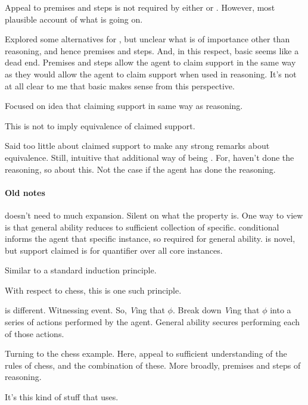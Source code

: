 \begin{note}[Alternatives]
  Appeal to premises and steps is not required by either \AR{} or \WR{}.
  However, most plausible account of what is going on.

  Explored some alternatives for \AR{}, but unclear what is of importance other than reasoning, and hence premises and steps.
  And, in this respect, basic \AR{} seems like a dead end.
  Premises and steps allow the agent to claim support in the same way as they would allow the agent to claim support when used in reasoning.
  It's not at all clear to me that basic \AR{} makes sense from this perspective.
\end{note}

\begin{note}
  Focused on idea that claiming support in same way as reasoning.

  This is not to imply equivalence of claimed support.

  Said too little about claimed support to make any strong remarks about equivalence.
  Still, intuitive that additional way of being \mom{}.
  For, haven't done the reasoning, so \mom{} about this.
  Not the case if the agent has done the reasoning.
\end{note}

\paragraph{Old notes}

\begin{note}
  \AR{} doesn't need to much expansion.
  Silent on what the property is.
  One way to view is that general ability reduces to sufficient collection of specific.
  \gsi{} conditional informs the agent that specific instance, so required for general ability.
  \gsi{} is novel, but support claimed is for quantifier over all core instances.

  Similar to a standard induction principle.

  With respect to chess, this is one such principle.
\end{note}

\begin{note}
  \WR{} is different.
  Witnessing event.
  So, \emph{V}ing that \(\phi\).
  Break down \emph{V}ing that \(\phi\) into a series of actions performed by the agent.
  General ability secures performing each of those actions.

  Turning to the chess example.
  Here, appeal to sufficient understanding of the rules of chess, and the combination of these.
  More broadly, premises and steps of reasoning.

  It's this kind of stuff that \WR{} uses.
\end{note}

